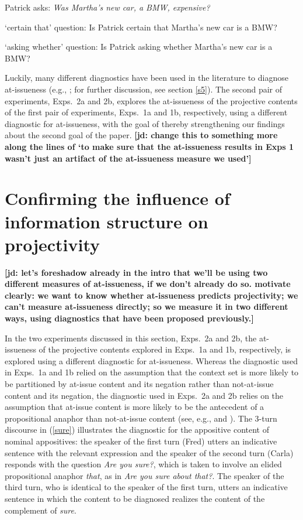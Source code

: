 \documentclass[11pt,fleqn]{article}
\newcommand{\6}{\mbox{$[\hspace*{-.6mm}[$}}
\newcommand{\9}{\mbox{$]\hspace*{-.6mm}]$}}
\newcommand{\jd}[1]{\textbf{\color{Green}[jd: #1]}}
\begin{document}
\begin{exe}

\exi{(\ref{stim})} Patrick asks: {\em Was Martha's new car, a BMW, expensive?} 

\begin{xlist}
\ex `certain that' question: Is Patrick certain that Martha's new car is a BMW?

\ex `asking whether' question: Is Patrick asking whether Martha's new car is a BMW?

\end{xlist}

\end{exe}
Luckily, many different diagnostics have been used in the literature to diagnose at-issueness (e.g., \citealt{tonhauser-sula6}; for further discussion, see section \ref{s5}). The second pair of experiments, Exps.~2a and 2b, explores the at-issueness of the projective contents of the first pair of experiments, Exps.~1a and 1b, respectively, using a different diagnostic for at-issueness, with the goal of thereby strengthening our findings about the second goal of the paper. \jd{change this to something more along the lines of `to make sure that the at-issueness results in Exps 1 wasn't just an artifact of the at-issueness measure we used'}


\section{Confirming the influence of information structure on projectivity}\label{s4}

\jd{let's foreshadow already in the intro that we'll be using two different measures of at-issueness, if we don't already do so. motivate clearly: we want to know whether at-issueness predicts projectivity; we can't measure at-issueness directly; so we measure it in two different ways, using diagnostics that have been proposed previously.}

In the two experiments discussed in this section, Exps.~2a and 2b, the at-issueness of the projective contents explored in Exps.~1a and 1b, respectively, is explored using a different diagnostic for at-issueness. Whereas the diagnostic used in Exps.~1a and 1b relied on the assumption that the context set is more likely to be partitioned by at-issue content and its negation rather than not-at-issue content and its negation, the diagnostic used in Exps.~2a and 2b relies on the assumption that at-issue content is more likely to be the antecedent of a propositional anaphor than not-at-issue content (see, e.g., \citealt[54]{potts05} and \citealt{tonhauser-sula6}). The 3-turn discourse in (\ref{sure}) illustrates the diagnostic for the appositive content of nominal appositives: the speaker of the first turn (Fred) utters an indicative sentence with the relevant expression and the speaker of the second turn (Carla) responds with the question {\em Are you sure?}, which is taken to involve an elided propositional anaphor {\em that}, as in {\em Are you sure about that?}. The speaker of the third turn, who is identical to the speaker of the first turn, utters an indicative sentence in which the content to be diagnosed realizes the content of the complement of {\em sure}. 
\end{document}
